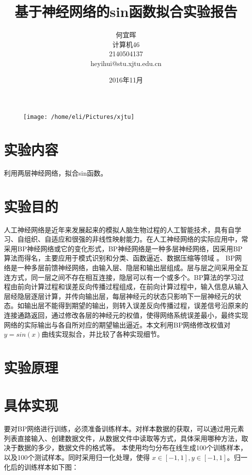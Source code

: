 \documentclass{article}
\date{2016年11月}
\title{基于神经网络的sin函数拟合实验报告}
\author{何宜晖\\计算机46\\2140504137\\heyihui@stu.xjtu.edu.cn}
\begin{document}
\begin{CJK}{UTF8}{gkai}
\begin{figure}
\centering
\texttt{[image: /home/eli/Pictures/xjtu]}
\end{figure}


\maketitle
\clearpage
\section{实验内容}
利用两层神经网络，拟合sin函数。
\section{实验目的}
人工神经网络是近年来发展起来的模拟人脑生物过程的人工智能技术，具有自学习、自组织、自适应和很强的非线性映射能力。在人工神经网络的实际应用中，常采用BP神经网络或它的变化形式，BP神经网络是一种多层神经网络，因采用BP算法而得名，主要应用于模式识别和分类、函数逼近、数据压缩等领域 \cite{bao2010} 。  
BP网络是一种多层前馈神经网络，由输入层、隐层和输出层组成。层与层之间采用全互连方式，同一层之间不存在相互连接，隐层可以有一个或多个。BP算法的学习过程由前向计算过程和误差反向传播过程组成，在前向计算过程中，输入信息从输入层经隐层逐层计算，并传向输出层，每层神经元的状态只影响下一层神经元的状态。如输出层不能得到期望的输出，则转入误差反向传播过程，误差信号沿原来的连接通路返回，通过修改各层的神经元的权值，使得网络系统误差最小，最终实现网络的实际输出与各自所对应的期望输出逼近。本文利用BP网络修改权值对$y=sin(x)$曲线实现拟合，并比较了各种实现细节。

\section{实验原理}

\section{具体实现}
要对BP网络进行训练，必须准备训练样本。对样本数据的获取，可以通过用元素列表直接输入、创建数据文件，从数据文件中读取等方式，具体采用哪种方法，取决于数据的多少，数据文件的格式等。  本使用均匀分布在线生成100个训练样本，以及100个测试样本。同时采用归一化处理，使得 $x \in [-1, 1], y\in [-1, 1]$。归一化后的训练样本如下图：


\end{CJK}
\end{document}
